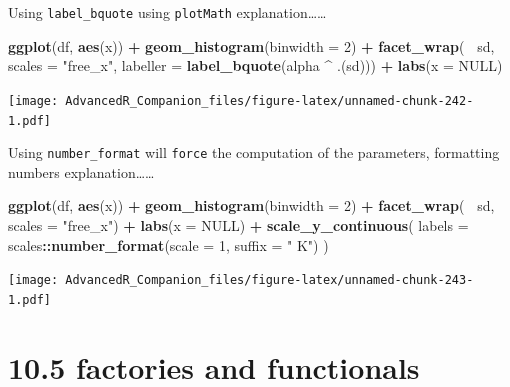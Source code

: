 \documentclass[]{book}
\newenvironment{Shaded}{\begin{snugshade}}{\end{snugshade}}
\newcommand{\DataTypeTok}[1]{\textcolor[rgb]{0.13,0.29,0.53}{#1}}
\newcommand{\DecValTok}[1]{\textcolor[rgb]{0.00,0.00,0.81}{#1}}
\newcommand{\KeywordTok}[1]{\textcolor[rgb]{0.13,0.29,0.53}{\textbf{#1}}}
\newcommand{\NormalTok}[1]{#1}
\newcommand{\OperatorTok}[1]{\textcolor[rgb]{0.81,0.36,0.00}{\textbf{#1}}}
\newcommand{\OtherTok}[1]{\textcolor[rgb]{0.56,0.35,0.01}{#1}}
\newcommand{\StringTok}[1]{\textcolor[rgb]{0.31,0.60,0.02}{#1}}
\begin{document}
Using \texttt{label\_bquote} using \texttt{plotMath} explanation\ldots{}\ldots{}

\begin{Shaded}
\begin{Highlighting}[]
\KeywordTok{ggplot}\NormalTok{(df, }\KeywordTok{aes}\NormalTok{(x)) }\OperatorTok{+}\StringTok{ }
\StringTok{  }\KeywordTok{geom_histogram}\NormalTok{(}\DataTypeTok{binwidth =} \DecValTok{2}\NormalTok{) }\OperatorTok{+}\StringTok{ }
\StringTok{  }\KeywordTok{facet_wrap}\NormalTok{(}\OperatorTok{~}\StringTok{ }\NormalTok{sd, }\DataTypeTok{scales =} \StringTok{"free_x"}\NormalTok{, }\DataTypeTok{labeller =} \KeywordTok{label_bquote}\NormalTok{(alpha }\OperatorTok{^}\StringTok{ }\NormalTok{.(sd))) }\OperatorTok{+}\StringTok{ }
\StringTok{  }\KeywordTok{labs}\NormalTok{(}\DataTypeTok{x =} \OtherTok{NULL}\NormalTok{) }
\end{Highlighting}
\end{Shaded}

\texttt{[image: AdvancedR\_Companion\_files/figure-latex/unnamed-chunk-242-1.pdf]}

Using \texttt{number\_format} will \texttt{force} the computation of the parameters, formatting numbers explanation\ldots{}\ldots{}

\begin{Shaded}
\begin{Highlighting}[]
\KeywordTok{ggplot}\NormalTok{(df, }\KeywordTok{aes}\NormalTok{(x)) }\OperatorTok{+}\StringTok{ }
\StringTok{  }\KeywordTok{geom_histogram}\NormalTok{(}\DataTypeTok{binwidth =} \DecValTok{2}\NormalTok{) }\OperatorTok{+}\StringTok{ }
\StringTok{  }\KeywordTok{facet_wrap}\NormalTok{(}\OperatorTok{~}\StringTok{ }\NormalTok{sd, }\DataTypeTok{scales =} \StringTok{"free_x"}\NormalTok{) }\OperatorTok{+}\StringTok{ }
\StringTok{  }\KeywordTok{labs}\NormalTok{(}\DataTypeTok{x =} \OtherTok{NULL}\NormalTok{) }\OperatorTok{+}
\StringTok{  }\KeywordTok{scale_y_continuous}\NormalTok{(}
  \DataTypeTok{labels =}\NormalTok{ scales}\OperatorTok{::}\KeywordTok{number_format}\NormalTok{(}\DataTypeTok{scale =} \DecValTok{1}\NormalTok{, }\DataTypeTok{suffix =} \StringTok{" K"}\NormalTok{) }
\NormalTok{)}
\end{Highlighting}
\end{Shaded}

\texttt{[image: AdvancedR\_Companion\_files/figure-latex/unnamed-chunk-243-1.pdf]}

\hypertarget{factories-and-functionals}{%
\section{10.5 factories and functionals}\label{factories-and-functionals}}
\end{document}
